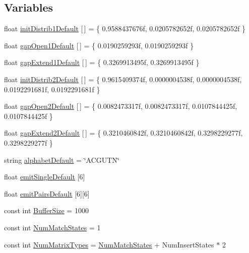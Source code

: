 \subsection*{Variables}
\begin{DoxyCompactItemize}
\item 
float \hyperlink{namespace_p_r_o_b_c_o_n_s_aa8038b03680de2e2d9a1887d20b5467f}{init\+Distrib1\+Default} \mbox{[}$\,$\mbox{]} = \{ 0.\+9588437676f, 0.\+0205782652f, 0.\+0205782652f \}
\item 
float \hyperlink{namespace_p_r_o_b_c_o_n_s_a5b6da1afa90c7279231be6813ac26c37}{gap\+Open1\+Default} \mbox{[}$\,$\mbox{]} = \{ 0.\+0190259293f, 0.\+0190259293f \}
\item 
float \hyperlink{namespace_p_r_o_b_c_o_n_s_a833e6c5dcb9594b964de8651c139d655}{gap\+Extend1\+Default} \mbox{[}$\,$\mbox{]} = \{ 0.\+3269913495f, 0.\+3269913495f \}
\item 
float \hyperlink{namespace_p_r_o_b_c_o_n_s_a7c5ee053f6a08b12797553be09091fbb}{init\+Distrib2\+Default} \mbox{[}$\,$\mbox{]} = \{ 0.\+9615409374f, 0.\+0000004538f, 0.\+0000004538f, 0.\+0192291681f, 0.\+0192291681f \}
\item 
float \hyperlink{namespace_p_r_o_b_c_o_n_s_a7b3932227ab3389404600ec5c3609d0d}{gap\+Open2\+Default} \mbox{[}$\,$\mbox{]} = \{ 0.\+0082473317f, 0.\+0082473317f, 0.\+0107844425f, 0.\+0107844425f \}
\item 
float \hyperlink{namespace_p_r_o_b_c_o_n_s_a1880db9507d0a694a8858b86c81c91ed}{gap\+Extend2\+Default} \mbox{[}$\,$\mbox{]} = \{ 0.\+3210460842f, 0.\+3210460842f, 0.\+3298229277f, 0.\+3298229277f \}
\item 
string \hyperlink{namespace_p_r_o_b_c_o_n_s_ae29cac54ccf09bf5f57237867b6da88b}{alphabet\+Default} = \char`\"{}A\+C\+G\+U\+T\+N\char`\"{}
\item 
float \hyperlink{namespace_p_r_o_b_c_o_n_s_ae1a79b9f9d56a9e4a4fb4549fbfd8c26}{emit\+Single\+Default} \mbox{[}6\mbox{]}
\item 
float \hyperlink{namespace_p_r_o_b_c_o_n_s_a7b7f8e2ed1d48ae7f4003a455d3f7150}{emit\+Pairs\+Default} \mbox{[}6\mbox{]}\mbox{[}6\mbox{]}
\item 
const int \hyperlink{namespace_p_r_o_b_c_o_n_s_ab9d548ecc7df58e583023207ab844623}{Buffer\+Size} = 1000
\item 
const int \hyperlink{namespace_p_r_o_b_c_o_n_s_a1ce3646341e8ca6190adcf1ae31e1cb6}{Num\+Match\+States} = 1
\item 
const int \hyperlink{namespace_p_r_o_b_c_o_n_s_aa757f46fbcab58d09517a449a680db3b}{Num\+Matrix\+Types} = \hyperlink{namespace_p_r_o_b_c_o_n_s_a1ce3646341e8ca6190adcf1ae31e1cb6}{Num\+Match\+States} + Num\+Insert\+States $\ast$ 2

\end{DoxyCompactItemize}
